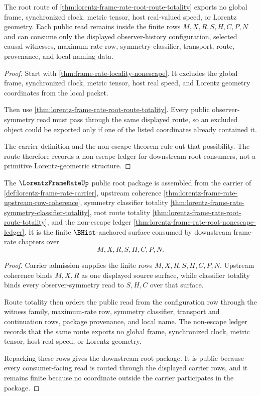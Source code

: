\begin{theorem}
\label{thm:lorentz-frame-rate-root-nonescape-ledger}
The root route of \autoref{thm:lorentz-frame-rate-root-route-totality}
exports no global frame, synchronized clock, metric tensor, host real-valued
speed, or Lorentz geometry. Each public read remains inside the finite rows
$M,X,R,S,H,C,P,N$ and can consume only the displayed observer-history
configuration, selected causal witnesses, maximum-rate row, symmetry
classifier, transport, route, provenance, and local naming data.
\end{theorem}
\begin{proof}
Start with \autoref{thm:frame-rate-locality-nonescape}. It excludes the
global frame, synchronized clock, metric tensor, host real speed, and Lorentz
geometry coordinates from the local packet.

Then use \autoref{thm:lorentz-frame-rate-root-route-totality}. Every public
observer-symmetry read must pass through the same displayed route, so an
excluded object could be exported only if one of the listed coordinates
already contained it.

The carrier definition and the non-escape theorem rule out that possibility.
The route therefore records a non-escape ledger for downstream root consumers,
not a primitive Lorentz-geometric structure.
\end{proof}

\begin{theorem}
\label{thm:lorentz-frame-rate-root-public-package}
The $\LorentzFrameRateUp$ public root package is assembled from the carrier
of \autoref{def:lorentz-frame-rate-carrier}, upstream coherence
\autoref{thm:lorentz-frame-rate-upstream-row-coherence}, symmetry classifier
totality \autoref{thm:lorentz-frame-rate-symmetry-classifier-totality}, root
route totality \autoref{thm:lorentz-frame-rate-root-route-totality}, and the
non-escape ledger \autoref{thm:lorentz-frame-rate-root-nonescape-ledger}.
It is the finite $\BHist$-anchored surface consumed by downstream
frame-rate chapters over
$$
M,X,R,S,H,C,P,N.
$$
\end{theorem}
\begin{proof}
Carrier admission supplies the finite rows $M,X,R,S,H,C,P,N$. Upstream
coherence binds $M,X,R$ as one displayed source surface, while classifier
totality binds every observer-symmetry read to $S,H,C$ over that surface.

Route totality then orders the public read from the configuration row through
the witness family, maximum-rate row, symmetry classifier, transport and
continuation rows, package provenance, and local name. The non-escape ledger
records that the same route exports no global frame, synchronized clock,
metric tensor, host real speed, or Lorentz geometry.

Repacking these rows gives the downstream root package. It is public because
every consumer-facing read is routed through the displayed carrier rows, and
it remains finite because no coordinate outside the carrier participates in
the package.
\end{proof}

